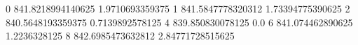 0 841.8218994140625 1.9710693359375
1 841.5847778320312 1.73394775390625
2 840.5648193359375 0.7139892578125
4 839.850830078125 0.0
6 841.074462890625 1.2236328125
8 842.6985473632812 2.84771728515625
